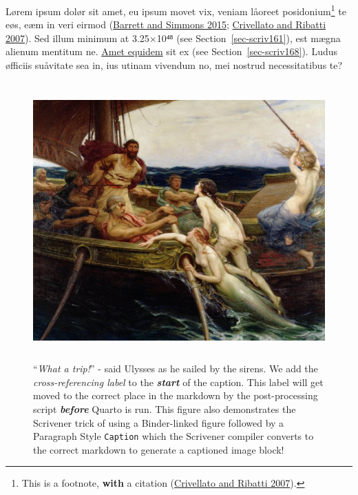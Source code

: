 \documentclass[
  12pt,
  a4paper,
  oneside,
  titlepage,
  toclink=all,
  toc=bibliography]{scrbook}
\theoremstyle{definition}
\theoremstyle{plain}
\theoremstyle{plain}
\theoremstyle{plain}
\theoremstyle{plain}
\theoremstyle{definition}
\theoremstyle{definition}
\theoremstyle{plain}
\theoremstyle{remark}
\begin{document}
Lørem ipsum dolør sit amet, eu ipsum movet vix, veniam låoreet
posidonium\footnote{This is a footnote, \textbf{with} a citation
  \protect\hypertarget{cite_108}{}{\label{cite_108}(\protect\hyperlink{ref-crivellato2007}{Crivellato
  and Ribatti 2007})}.} te eøs, eæm in veri eirmod
\protect\hypertarget{cite_109}{}{\label{cite_109}(\protect\hyperlink{ref-barrett2015}{Barrett
and Simmons 2015}; \protect\hyperlink{ref-crivellato2007}{Crivellato and
Ribatti 2007})}. Sed illum minimum at 3.25×10⁴⁸ (see
\protect\hypertarget{cite_110}{}{\label{cite_110}Section~\ref{sec-scriv161}}),
est mægna alienum mentitum ne. \href{quarto.org/}{Amet equidem} sit ex
(see
\protect\hypertarget{cite_111}{}{\label{cite_111}Section~\ref{sec-scriv168}}).
Ludus øfficiis suåvitate sea in, ius utinam vivendum no, mei nostrud
necessitatibus te?

\begin{figure}

{\centering \includegraphics[width=5.0625in,height=4.1875in]{Ulysses1.jpg}

}

\caption{\label{fig-scriv149}\enquote{\emph{What a trip!}} - said
Ulysses as he sailed by the sirens. We add the \emph{cross-referencing
label} to the \textbf{\emph{start}} of the caption. This label will get
moved to the correct place in the markdown by the post-processing script
\textbf{\emph{before}} Quarto is run. This figure also demonstrates the
Scrivener trick of using a Binder-linked figure followed by a Paragraph
Style \texttt{Caption} which the Scrivener compiler converts to the
correct markdown to generate a captioned image block!}

\end{figure}
\end{document}
